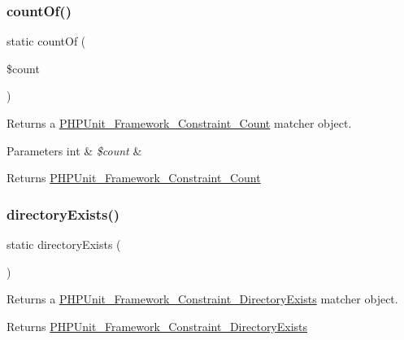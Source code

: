 \subsubsection{\texorpdfstring{count\+Of()}{countOf()}}
{\footnotesize\ttfamily static count\+Of (\begin{DoxyParamCaption}\item[{}]{\$count }\end{DoxyParamCaption})\hspace{0.3cm}{\ttfamily [static]}}

Returns a \mbox{\hyperlink{class_p_h_p_unit___framework___constraint___count}{P\+H\+P\+Unit\+\_\+\+Framework\+\_\+\+Constraint\+\_\+\+Count}} matcher object.


\begin{DoxyParams}[1]{Parameters}
int & {\em \$count} & \\
\hline
\end{DoxyParams}
\begin{DoxyReturn}{Returns}
\mbox{\hyperlink{class_p_h_p_unit___framework___constraint___count}{P\+H\+P\+Unit\+\_\+\+Framework\+\_\+\+Constraint\+\_\+\+Count}} 
\end{DoxyReturn}
\mbox{\label{class_p_h_p_unit___framework___assert_aeff6357919ac620ffb892dc627f6b90b}} 
\subsubsection{\texorpdfstring{directory\+Exists()}{directoryExists()}}
{\footnotesize\ttfamily static directory\+Exists (\begin{DoxyParamCaption}{ }\end{DoxyParamCaption})\hspace{0.3cm}{\ttfamily [static]}}

Returns a \mbox{\hyperlink{class_p_h_p_unit___framework___constraint___directory_exists}{P\+H\+P\+Unit\+\_\+\+Framework\+\_\+\+Constraint\+\_\+\+Directory\+Exists}} matcher object.

\begin{DoxyReturn}{Returns}
\mbox{\hyperlink{class_p_h_p_unit___framework___constraint___directory_exists}{P\+H\+P\+Unit\+\_\+\+Framework\+\_\+\+Constraint\+\_\+\+Directory\+Exists}} 
\end{DoxyReturn}
\mbox{\label{class_p_h_p_unit___framework___assert_a66c8e09330ad5201f515d1842b017a55}} 
